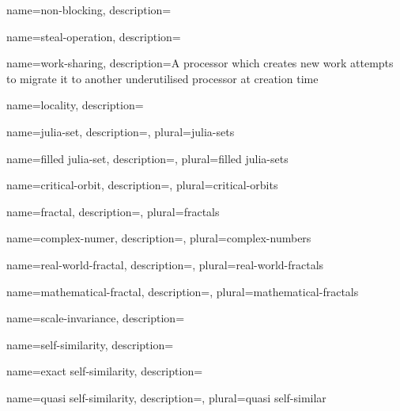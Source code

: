 {
    name={non-blocking},
    description={}
}

{
    name={steal-operation},
    description={}
}

{
    name={work-sharing},
    description={A processor which creates new work attempts to migrate it to 
                 another underutilised processor at creation time}
}

{
    name={locality},
    description={}
}

{
    name={julia-set},
    description={},
    plural={julia-sets}
}

{
    name={filled julia-set},
    description={},
    plural={filled julia-sets}
}

{
    name={critical-orbit},
    description={},
    plural={critical-orbits}
}

{
    name={fractal},
    description={},
    plural={fractals}
}

{
    name={complex-numer},
    description={},
    plural={complex-numbers}
}

{
    name={real-world-fractal},
    description={},
    plural={real-world-fractals}
}

{
    name={mathematical-fractal},
    description={},
    plural={mathematical-fractals}
}

{
    name={scale-invariance},
    description={}
}

{
    name={self-similarity},
    description={}
}

{
    name={exact self-similarity},
    description={}
}

{
    name={quasi self-similarity},
    description={},
    plural={quasi self-similar}
}
